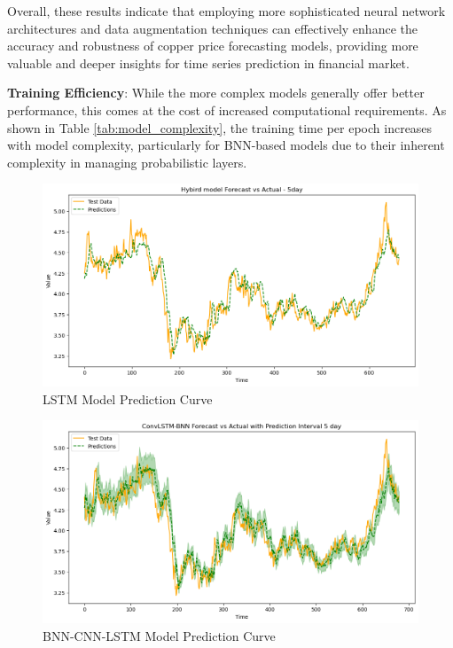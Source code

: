 \documentclass[final-report]{report-template}
\begin{document}
Overall, these results indicate that employing more sophisticated neural network architectures and data augmentation techniques can effectively enhance the accuracy and robustness of copper price forecasting models, providing more valuable and deeper insights for time series prediction in financial market.
\begin{table}[h]
\centering
\caption{Model Complexity Comparison}
\label{tab:model_complexity}
\end{table}
\textbf{Training Efficiency}: While the more complex models generally offer better performance, this comes at the cost of increased computational requirements. As shown in Table \autoref{tab:model_complexity}, the training time per epoch increases with model complexity, particularly for BNN-based models due to their inherent complexity in managing probabilistic layers.

\begin{figure}[h]
    \centering
    \includegraphics[width=0.7\linewidth]{figures/lstm_prediction_curve.png}
    \caption{LSTM Model Prediction Curve}
    \label{fig:lstm_prediction_curve}
\end{figure}
\begin{figure}[h]
    \centering
    \includegraphics[width=0.7\linewidth]{figures/bnn_prediction_curve.png}
    \caption{BNN-CNN-LSTM Model Prediction Curve}
    \label{fig:bnn_prediction_curve}
\end{figure}
\end{document}
